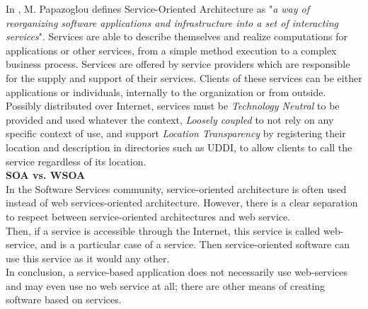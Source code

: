 In \cite{Papazoglou:2003}, M. Papazoglou defines Service-Oriented Architecture as "{\it a way of reorganizing software applications and infrastructure into a set of interacting services}". Services are able to describe themselves and realize computations for applications or other services, from a simple method execution to a complex business process. Services are offered by service providers which are responsible for the supply and support of their services. Clients of these services can be either applications or individuals, internally to the organization or from outside.\\
Possibly distributed over Internet, services must be {\it Technology Neutral} to be provided and used whatever the context, {\it Loosely coupled} to not rely on any specific context of use, and support {\it Location Transparency} by registering their location and description in directories such as UDDI, to allow clients to call the service regardless of its location.\\


{\bf SOA vs. WSOA}\\
In the Software Services community, service-oriented architecture is often used instead of web services-oriented architecture. However, there is a clear separation to respect between service-oriented architectures and web service.\\
Then, if a service is accessible through the Internet, this service is called web-service, and is a particular case of a service. Then service-oriented software can use this service as it would any other. \\
In conclusion, a service-based application does not necessarily use web-services and may even use no web service at all; there are other means of creating software based on services.\\

